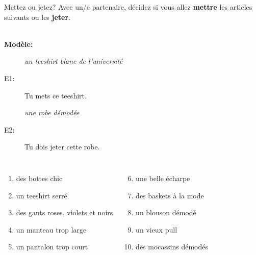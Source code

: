 \documentclass{beamer}
\begin{document}
  \begin{frame}{Mettez ou jetez?}
    Avec un/e partenaire, décidez si vous allez \textbf{mettre} les articles suivants ou les \textbf{jeter}. \\
     \\
    \begin{description}
      \item[\textbf{Modèle:}] \emph{un teeshirt blanc de l'université}
      \item[E1:] Tu mets ce teeshirt.
      \item[] \emph{une robe démodée}
      \item[E2:] Tu dois jeter cette robe.
    \end{description}
    \begin{columns}
        \begin{enumerate}
          \item des bottes chic
          \item un teeshirt serré
          \item des gants roses, violets et noirs
          \item un manteau trop large
          \item un pantalon trop court
        \end{enumerate}
        \begin{enumerate}
          \setcounter{enumi}{5}
          \item une belle écharpe
          \item des baskets à la mode
          \item un blouson démodé
          \item un vieux pull
          \item des mocassins démodés
        \end{enumerate}
    \end{columns}
  \end{frame}
\end{document}
